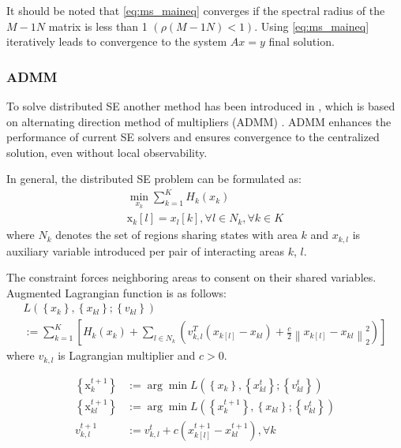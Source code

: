 It should be noted that \ref{eq:ms_maineq} converges if the spectral radius of the \(M-1N\) matrix is less than 1 \((\rho(M-1N) < 1)\). Using \ref{eq:ms_maineq} iteratively leads to convergence to the system \(Ax = y\) final solution.

\subsubsection{ADMM} 
To solve distributed SE another method has been introduced in \autocite{6340375}, which is based on alternating direction method of multipliers (ADMM) \autocite{boyd2004convex}. ADMM enhances the performance of current SE solvers and ensures convergence to the centralized solution, even without local observability.

In general, the distributed SE problem can be formulated as:
\begin{equation}
    \begin{array}{c}
\min _{x_{k}} \sum_{k=1}^{K} H_{k}\left(x_{k}\right) \\
\mathrm{x}_{k}[l]=x_{l}[k], \forall l \in N_{k}, \forall k \in K
\end{array}
\end{equation}
where $N_k$ denotes the set of regions sharing states with area $k$ and $x_{k,l}$ is auxiliary variable introduced per pair of interacting areas $k$, $l$.

The constraint forces neighboring areas to consent on their shared variables. Augmented Lagrangian function is as follows:
\begin{equation}
    \begin{array}{c}
L\left(\left\{x_{k}\right\},\left\{x_{k l}\right\} ;\left\{v_{k l}\right\}\right) \\
:=\sum_{k=1}^{K}\left[H_{k}\left(x_{k}\right)+\sum_{l \in N_{k}}\left(v_{k, l}^{T}\left(x_{k[l]}-x_{k l}\right)+\frac{c}{2}\left\|x_{k[l]}-x_{k l}\right\|_{2}^{2}\right)\right]
\end{array}
\end{equation}
where $v_{k,l}$ is Lagrangian multiplier and \(c > 0\).

\begin{equation}
    \begin{aligned}
\left\{\mathrm{x}_{k}^{t+1}\right\} & :=\arg \min L\left(\left\{x_{k}\right\},\left\{x_{k l}^{t}\right\} ;\left\{v_{k l}^{t}\right\}\right) \\
\left\{\mathrm{x}_{k l}^{t+1}\right\} & :=\arg \min L\left(\left\{x_{k}^{t+1}\right\},\left\{x_{k l}\right\} ;\left\{v_{k l}^{t}\right\}\right) \\
v_{k, l}^{t+1} & :=v_{k, l}^{t}+c\left(x_{k[l]}^{t+1}-x_{k l}^{t+1}\right), \forall k
\end{aligned}
\end{equation}



